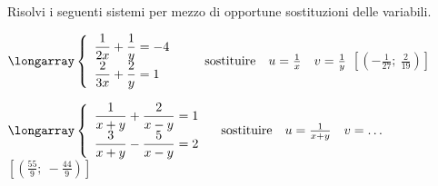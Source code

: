 \begin{esercizio}[\Ast]
 \label{ese:22.64}
 Risolvi i seguenti sistemi per mezzo di opportune sostituzioni delle variabili.

\begin{enumeratea}
\item $\longarray\left\{\begin{array}{l}
\dfrac{1}{2x}+\dfrac{1}{y}=-4\\\dfrac{2}{3x}+\dfrac{2}{y}=1
\end{array}\right. 
\qquad \text{sostituire} \quad u=\frac{1}{x} \quad v=\frac{1}{y}$
\hfill $\left[\left(-{\frac{1}{27}};~\frac{2}{19}\right)\right]$


\item $\longarray\left\{\begin{array}{l}
\dfrac{1}{x+y}+\dfrac{2}{x-y}=1\\\dfrac{3}{x+y}-\dfrac{5}{x-y}=2
\end{array}\right. 
\quad \text{sostituire} \quad u=\frac{1}{x+y} \quad v=\ldots$
\hfill $\left[\left(\frac{55}{9};~-\frac{44}{9}\right)\right]$

\end{enumeratea}
\end{esercizio}

